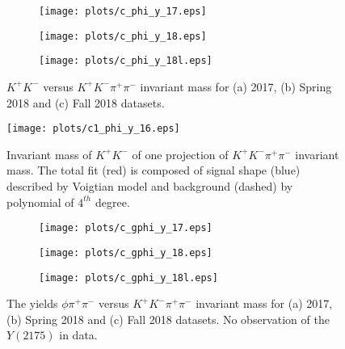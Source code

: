\begin{figure}[H]
    \centering
    \begin{subfigure}[b]{0.49\textwidth}
        \texttt{[image: plots/c\_phi\_y\_17.eps]}
        \caption{}
        \label{fig.xsec_ul.yphi2pi.1.a}
    \end{subfigure}
    \begin{subfigure}[b]{0.49\textwidth}
        \texttt{[image: plots/c\_phi\_y\_18.eps]}
        \caption{}
        \label{fig.xsec_ul.yphi2pi.1.b}
    \end{subfigure}
    \begin{subfigure}[b]{0.49\textwidth}
        \texttt{[image: plots/c\_phi\_y\_18l.eps]}
        \caption{}
        \label{fig.xsec_ul.yphi2pi.1.c}
    \end{subfigure}
    \caption{$K^{+}K^{-}$ versus $K^{+}K^{-} \pi^+ \pi^-$ invariant mass for (a) 2017, (b) Spring 2018 and (c) Fall 2018 datasets.}
    \label{fig.xsec_ul.yphi2pi.1}
\end{figure}

\begin{figure}[H]
    \centering
    \texttt{[image: plots/c1\_phi\_y\_16.eps]}
    \caption{\label{fig.xsec_ul.yphi2pi.2}Invariant mass of $K^{+}K^{-}$ of one projection of $K^{+}K^{-} \pi^+ \pi^-$ invariant mass. The total fit (red) is composed of signal shape (blue) described by Voigtian model and background (dashed) by polynomial of $4^{th}$ degree.}
\end{figure}

\begin{figure}[H]
    \centering
    \begin{subfigure}[b]{0.49\textwidth}
        \texttt{[image: plots/c\_gphi\_y\_17.eps]}
        \caption{}
        \label{fig.xsec_ul.yphi2pi.3.a}
    \end{subfigure}
    \begin{subfigure}[b]{0.49\textwidth}
        \texttt{[image: plots/c\_gphi\_y\_18.eps]}
        \caption{}
        \label{fig.xsec_ul.yphi2pi.3.b}
    \end{subfigure}
    \begin{subfigure}[b]{0.49\textwidth}
        \texttt{[image: plots/c\_gphi\_y\_18l.eps]}
        \caption{}
        \label{fig.xsec_ul.yphi2pi.3.c}
    \end{subfigure}
    \caption{The yields $\phi \pi^+ \pi^-$ versus $K^{+}K^{-} \pi^+ \pi^-$ invariant mass for (a) 2017, (b) Spring 2018 and (c) Fall 2018 datasets. No observation of the $Y(2175)$ in data.}
    \label{fig.xsec_ul.yphi2pi.3}
\end{figure}

